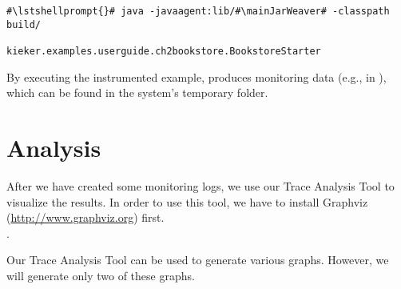 		\setBashListing
		\begin{lstlisting}[gobble=6,caption=Command to run the Bookstore]			
			#\lstshellprompt{}# java -javaagent:lib/#\mainJarWeaver# -classpath build/
			    kieker.examples.userguide.ch2bookstore.BookstoreStarter
		\end{lstlisting} 
		
		\noindent
		By executing the instrumented example, \Kieker{} produces monitoring data (e.g., in ), which can be found in the system's temporary folder.
	
	\section{Analysis}
	
		After we have created some monitoring logs, we use our Trace Analysis Tool to visualize the results. In order to use this tool, we have to install Graphviz (\url{http://www.graphviz.org}) first. \\

		.		
		
		Our Trace Analysis Tool can be used to generate various graphs. However, we will generate only two of these graphs.